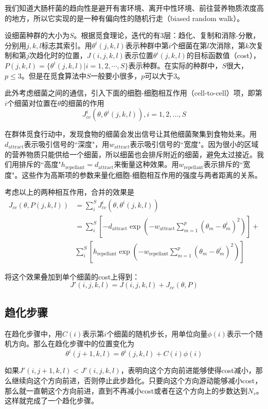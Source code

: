 \documentclass{article}
\begin{document}
我们知道大肠杆菌的趋向性是避开有害环境、离开中性环境、前往营养物质浓度高的地方，所以它实现的是一种有偏向性的随机行走（biased random walk）。

设细菌种群的大小为$S$。根据觅食理论，迭代的有3层：趋化、复制和消除-分散，分别用$j, k, l$标志其索引。用$\theta^i(j, k, l)$表示种群中第$i$个细菌在第$l$次消除，第$k$次复制和第$j$次趋化时的位置，$J(i, j, k, l)$表示位置$\theta^i(j, k, l)$的目标函数值（cost），$P(j, k, l) = \{\theta^i(j,k,l)|i = 1, 2, \cdots, S\}$表示种群。在实际的种群中，$S$很大，$p \leq 3$。但是在觅食算法中$S$一般要小很多，$p$可以大于3。

此外考虑细菌之间的通信，引入下面的细胞-细胞相互作用（cell-to-cell）项，即第$i$个细菌对位置在$\theta$的细菌的作用
$$J^i_{cc}(\theta, \theta^i(j, k, l)), i = 1, 2, ..., S$$

在群体觅食行动中，发现食物的细菌会发出信号让其他细菌聚集到食物处来。用$d_{\text{attract}}$表示吸引信号的``深度"，用$w_{\text{attract}}$表示吸引信号的``宽度"。因为很小的区域的营养物质只能供给一个细菌，所以细菌也会排斥附近的细菌，避免太过接近。我们用排斥的``高度"$h_{\text{repellant}} = d_{\text{attract}}$来衡量这种效果。用$w_{\text{repellant}}$表示排斥的``宽度"。这些作为高斯项的参数来量化细胞-细胞相互作用的强度与两者距离的关系。

考虑以上的两种相互作用，合并的效果是
\begin{align}
J_{cc}(\theta, P(j, k, l)) &= \sum_i^SJ^i_{cc}(\theta, \theta^i(j,k,l)) \\
 &= \sum_i^S[-d_{\text{attract}}\exp(-w_{\text{attract}}\sum_{m=1}^p(\theta_m-\theta^i_m)^2)] + \\
& \sum_i^S[h_{\text{repellant}}\exp(-w_{\text{repellant}}\sum_{m=1}^p(\theta_m-\theta^i_m)^2)]
\end{align}

将这个效果叠加到单个细菌的cost上得到：
$$J'(i, j, k, l) = J(i, j, k, l) + J_{cc}(\theta, P)$$

\subsection{趋化步骤}
在趋化步骤中，用$C(i)$表示第$i$个细菌的随机步长，用单位向量$\phi(i)$表示一个随机方向。那么在趋化步骤中的位置变化为
\begin{equation}
    \theta^i(j + 1, k, l) = \theta^i(j, k, l) + C(i)\phi(i)
\end{equation}

如果$J'(i, j+1, k, l) < J'(i, j, k, l)$，表明向这个方向前进能够使得cost减小，那么继续向这个方向前进，否则停止此步趋化。只要向这个方向游动能够减小cost，那么就一直朝这个方向前进，直到不再减小cost或者在这个方向上的步数达到$N_s$。这样就完成了一个趋化步骤。
\end{document}
